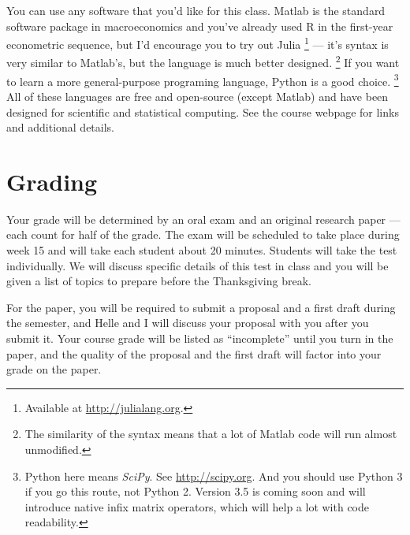 You can use any software that you'd like for this class.
Matlab is the standard software package in macroeconomics and you've
already used R in the first-year econometric sequence, but I'd
encourage you to try out Julia%
\footnote{Available at \url{http://julialang.org}.} %
--- it's syntax is very similar to
Matlab's, but the language is much better designed.%
\footnote{The similarity of the syntax means that a lot of Matlab code
  will run almost unmodified.} %
If you want to learn a more general-purpose programing language,
Python is a good choice.%
\footnote{Python here means \emph{SciPy}. See
  \url{http://scipy.org}. And you should use Python 3 if you go this
  route, not Python 2. Version 3.5 is coming soon and will introduce
  native infix matrix operators, which will help a lot with code
  readability.} %
All of these languages are free and open-source (except Matlab) and
have been designed for scientific and statistical computing. See the
course webpage for links and additional details.

\section{Grading}
Your grade will be determined by an oral exam and an original research
paper --- each count for half of the grade. The exam will be scheduled
to take place during week 15 and will take each student about 20
minutes. Students will take the test individually. We will discuss
specific details of this test in class and you will be given a list of
topics to prepare before the Thanksgiving break.

For the paper, you will be required to submit a proposal and a first
draft during the semester, and Helle and I will discuss your proposal
with you after you submit it. Your course grade will be listed as
``incomplete'' until you turn in the paper, and the quality of the
proposal and the first draft will factor into your grade on the paper.

